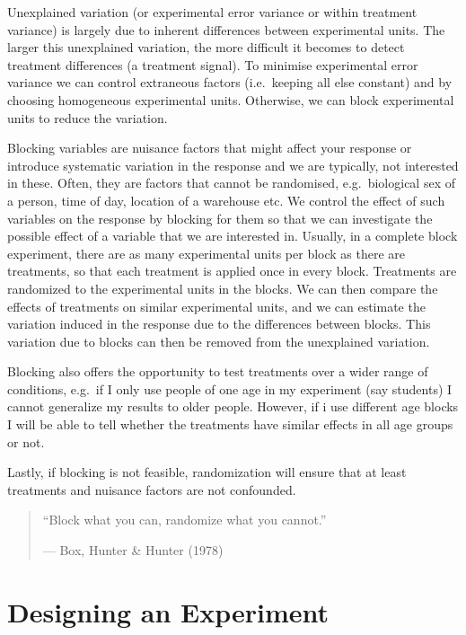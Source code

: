 \documentclass[
  letterpaper,
]{book}
\begin{document}

Unexplained variation (or experimental error variance or within
treatment variance) is largely due to inherent differences between
experimental units. The larger this unexplained variation, the more
difficult it becomes to detect treatment differences (a treatment
signal). To minimise experimental error variance we can control
extraneous factors (i.e.~keeping all else constant) and by choosing
homogeneous experimental units. Otherwise, we can block experimental
units to reduce the variation.

Blocking variables are nuisance factors that might affect your response
or introduce systematic variation in the response and we are typically,
not interested in these. Often, they are factors that cannot be
randomised, e.g.~biological sex of a person, time of day, location of a
warehouse etc. We control the effect of such variables on the response
by blocking for them so that we can investigate the possible effect of a
variable that we are interested in. Usually, in a complete block
experiment, there are as many experimental units per block as there are
treatments, so that each treatment is applied once in every block.
Treatments are randomized to the experimental units in the blocks. We
can then compare the effects of treatments on similar experimental
units, and we can estimate the variation induced in the response due to
the differences between blocks. This variation due to blocks can then be
removed from the unexplained variation.

Blocking also offers the opportunity to test treatments over a wider
range of conditions, e.g.~if I only use people of one age in my
experiment (say students) I cannot generalize my results to older
people. However, if i use different age blocks I will be able to tell
whether the treatments have similar effects in all age groups or not.

Lastly, if blocking is not feasible, randomization will ensure that at
least treatments and nuisance factors are not confounded.

\begin{quote}
``Block what you can, randomize what you cannot.''

--- Box, Hunter \& Hunter (1978)
\end{quote}

\chapter{Designing an Experiment}\label{designing-an-experiment}
\end{document}
